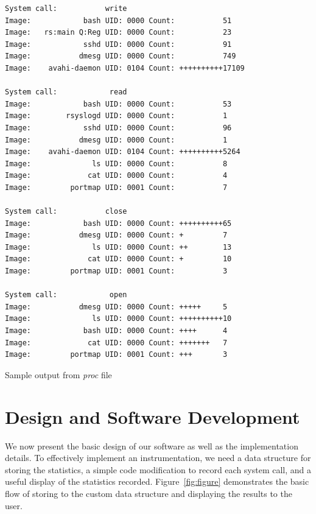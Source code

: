 \documentclass[conference]{IEEEtran}
\begin{document}
\begin{algorithm*}[t!]
\begin{verbatim}
System call:           write
Image:            bash UID: 0000 Count:           51
Image:   rs:main Q:Reg UID: 0000 Count:           23
Image:            sshd UID: 0000 Count:           91
Image:           dmesg UID: 0000 Count:           749
Image:    avahi-daemon UID: 0104 Count: ++++++++++17109

System call:            read
Image:            bash UID: 0000 Count:           53
Image:        rsyslogd UID: 0000 Count:           1
Image:            sshd UID: 0000 Count:           96
Image:           dmesg UID: 0000 Count:           1
Image:    avahi-daemon UID: 0104 Count: ++++++++++5264
Image:              ls UID: 0000 Count:           8
Image:             cat UID: 0000 Count:           4
Image:         portmap UID: 0001 Count:           7

System call:           close
Image:            bash UID: 0000 Count: ++++++++++65
Image:           dmesg UID: 0000 Count: +         7
Image:              ls UID: 0000 Count: ++        13
Image:             cat UID: 0000 Count: +         10
Image:         portmap UID: 0001 Count:           3

System call:            open
Image:           dmesg UID: 0000 Count: +++++     5
Image:              ls UID: 0000 Count: ++++++++++10
Image:            bash UID: 0000 Count: ++++      4
Image:             cat UID: 0000 Count: +++++++   7
Image:         portmap UID: 0001 Count: +++       3
\end{verbatim}
\caption{Sample output from \textit{proc} file}
\end{algorithm*}


\section{Design and Software Development}
\label{sec:design}
We now present the basic design of our software as well as the implementation details.
To effectively implement an instrumentation, we need a data structure for storing the statistics, a simple code modification to record each system call, and a useful display of the statistics recorded.
Figure~\ref{fig:figure} demonstrates the basic flow of storing to the custom data structure and displaying the results to the user.
\end{document}
